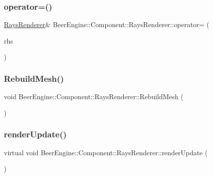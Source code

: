\subsubsection{\texorpdfstring{operator=()}{operator=()}}
{\footnotesize\ttfamily \mbox{\hyperlink{class_beer_engine_1_1_component_1_1_rays_renderer}{Rays\+Renderer}}\& Beer\+Engine\+::\+Component\+::\+Rays\+Renderer\+::operator= (\begin{DoxyParamCaption}\item[{\mbox{\hyperlink{class_beer_engine_1_1_component_1_1_rays_renderer}{Rays\+Renderer}} const \&}]{rhs }\end{DoxyParamCaption})}

\mbox{\label{class_beer_engine_1_1_component_1_1_rays_renderer_ab452c92a57a002fced157ec9913d40c8}} 
\subsubsection{\texorpdfstring{Rebuild\+Mesh()}{RebuildMesh()}}
{\footnotesize\ttfamily void Beer\+Engine\+::\+Component\+::\+Rays\+Renderer\+::\+Rebuild\+Mesh (\begin{DoxyParamCaption}{ }\end{DoxyParamCaption})}

\mbox{\label{class_beer_engine_1_1_component_1_1_rays_renderer_a1647c9a5f40fc9186ccb6d55b7ebfe5e}} 
\subsubsection{\texorpdfstring{render\+Update()}{renderUpdate()}}
{\footnotesize\ttfamily virtual void Beer\+Engine\+::\+Component\+::\+Rays\+Renderer\+::render\+Update (\begin{DoxyParamCaption}\item[{void}]{ }\end{DoxyParamCaption})\hspace{0.3cm}{\ttfamily [virtual]}}



